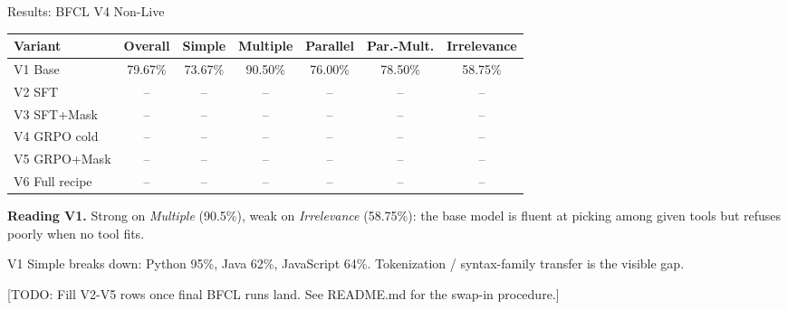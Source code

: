 \documentclass[aspectratio=169,11pt]{beamer}
\newcommand{\todo}[1]{{\color{tbd}\textsf{[TODO: #1]}}}
\newcommand{\tbd}{{\color{tbd}--}}
\begin{document}
\begin{frame}{Results: BFCL V4 Non-Live}
  \begin{table}
    \centering
    \scriptsize
    \begin{tabular}{lcccccc}
      \toprule
      \textbf{Variant} & \textbf{Overall} & \textbf{Simple} & \textbf{Multiple} & \textbf{Parallel} & \textbf{Par.-Mult.} & \textbf{Irrelevance} \\
      \midrule
      V1 Base               & 79.67\% & 73.67\% & 90.50\% & 76.00\% & 78.50\% & 58.75\% \\
      V2 SFT                & \tbd & \tbd & \tbd & \tbd & \tbd & \tbd \\
      V3 SFT+Mask           & \tbd & \tbd & \tbd & \tbd & \tbd & \tbd \\
      V4 GRPO cold          & \tbd & \tbd & \tbd & \tbd & \tbd & \tbd \\
      V5 GRPO+Mask          & \tbd & \tbd & \tbd & \tbd & \tbd & \tbd \\
      V6 Full recipe        & \tbd & \tbd & \tbd & \tbd & \tbd & \tbd \\
      \bottomrule
    \end{tabular}
  \end{table}
  \vspace{4pt}
  \textbf{Reading V1.} Strong on \emph{Multiple} (90.5\%), weak on \emph{Irrelevance} (58.75\%): the base model is fluent at picking among given tools but refuses poorly when no tool fits.
  \vspace{2pt}

  {\small V1 Simple breaks down: Python 95\%, Java 62\%, JavaScript 64\%. Tokenization / syntax-family transfer is the visible gap.}
  \vspace{2pt}

  \todo{Fill V2-V5 rows once final BFCL runs land. See README.md for the swap-in procedure.}
\end{frame}
\end{document}
